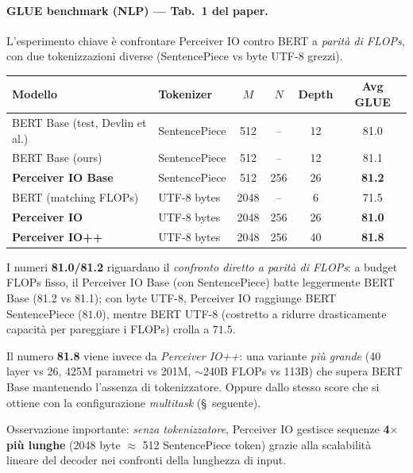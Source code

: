 \documentclass[
  11pt,
]{article}
\begin{document}
\paragraph{GLUE benchmark (NLP) --- Tab.\ 1 del paper.} L'esperimento chiave è confrontare Perceiver IO contro BERT a \emph{parità di FLOPs}, con due tokenizzazioni diverse (SentencePiece vs byte UTF-8 grezzi).

{\small
\begin{longtable}{@{}p{4.5cm} p{2.5cm} c c c c@{}}
\toprule
\textbf{Modello} & \textbf{Tokenizer} & \textbf{$M$} & \textbf{$N$} & \textbf{Depth} & \textbf{Avg GLUE} \\
\midrule
\endhead
BERT Base (test, Devlin et al.) & SentencePiece & 512 & -- & 12 & 81.0 \\[2pt]
BERT Base (ours) & SentencePiece & 512 & -- & 12 & 81.1 \\[2pt]
\textbf{Perceiver IO Base} & SentencePiece & 512 & 256 & 26 & \textbf{81.2} \\[2pt]
\midrule
BERT (matching FLOPs) & UTF-8 bytes & 2048 & -- & 6 & 71.5 \\[2pt]
\textbf{Perceiver IO} & UTF-8 bytes & 2048 & 256 & 26 & \textbf{81.0} \\[2pt]
\textbf{Perceiver IO++} & UTF-8 bytes & 2048 & 256 & 40 & \textbf{81.8} \\
\bottomrule
\end{longtable}
}

\begin{notabox}[title={\textbf{Perceiver IO su GLUE: due risultati, uno spesso confuso}}]
I numeri \textbf{81.0/81.2} riguardano il \emph{confronto diretto a parità di FLOPs}: a budget FLOPs fisso, il Perceiver IO Base (con SentencePiece) batte leggermente BERT Base (81.2 vs 81.1); con byte UTF-8, Perceiver IO raggiunge BERT SentencePiece ($81.0$), mentre BERT UTF-8 (costretto a ridurre drasticamente capacità per pareggiare i FLOPs) crolla a $71.5$.

Il numero \textbf{81.8} viene invece da \emph{Perceiver IO++}: una variante \emph{più grande} (40 layer vs 26, 425M parametri vs 201M, $\sim$240B FLOPs vs 113B) che supera BERT Base mantenendo l'assenza di tokenizzatore. Oppure dallo stesso score che si ottiene con la configurazione \emph{multitask} (\S~seguente).

Osservazione importante: \emph{senza tokenizzatore}, Perceiver IO gestisce sequenze \textbf{4$\times$ più lunghe} (2048 byte $\approx$ 512 SentencePiece token) grazie alla scalabilità lineare del decoder nei confronti della lunghezza di input.
\end{notabox}
\end{document}

